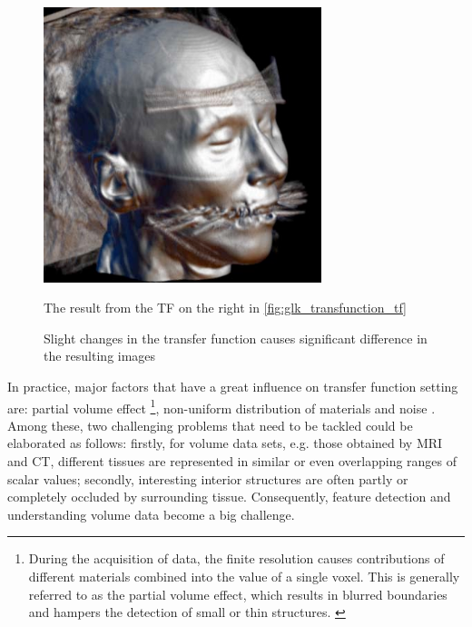 \begin{figure}
\begin{minipage}{0.25\textwidth}
        \end{minipage}~
        ~ %
        \begin{minipage}{0.25\textwidth}
                \centering
                \includegraphics[width=1\linewidth]{images/glk_transfunction_2.png}
                \caption{The result from the TF on the right in \ref{fig:glk_transfunction_tf}}
                \label{fig:glk_transfunction_2}
        \end{minipage}    
        \caption{Slight changes in the transfer function causes significant difference in the resulting images \cite{kindlmann_transfer_2002}}
        \label{fig:multiple_glk_transfunction}
\end{figure}

In practice, major factors that have a great influence on transfer function setting are: partial volume effect \footnote{During the acquisition of data, the finite resolution causes contributions of different materials combined into the value of a single voxel. This is generally referred to as the partial volume effect, which results in blurred boundaries and hampers the detection of small or thin structures. \cite{serlie_classifying_2007}}, non-uniform distribution of materials and noise \cite{serlie_computed_2003}.
Among these, two challenging problems that need to be tackled could be elaborated as follows: firstly, for volume data sets, e.g. those obtained by MRI and CT, different tissues are represented in similar or even overlapping ranges of scalar values; secondly, interesting interior structures are often partly or completely occluded by surrounding tissue.
Consequently, feature detection and understanding volume data become a big challenge.

